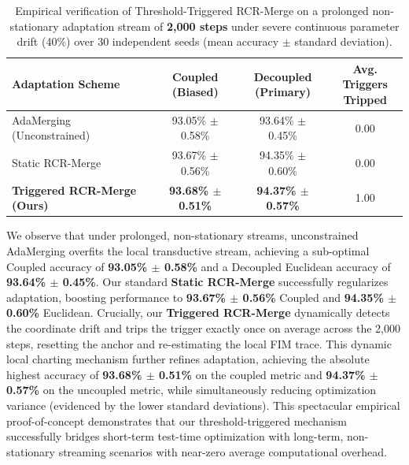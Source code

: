 \begin{table}[h]
\caption{Empirical verification of Threshold-Triggered RCR-Merge on a prolonged non-stationary adaptation stream of \textbf{2,000 steps} under severe continuous parameter drift (40\%) over 30 independent seeds (mean accuracy $\pm$ standard deviation).}
\label{tab:long_term_results}
\vskip 0.1in
\begin{center}
\begin{small}
\begin{sc}
\begin{tabular}{l|ccc}
\toprule
Adaptation Scheme & \shortstack{Coupled \\ (Biased)} & \shortstack{Decoupled \\ (Primary)} & \shortstack{Avg. Triggers \\ Tripped} \\
\midrule
AdaMerging (Unconstrained) & 93.05\% $\pm$ 0.58\% & 93.64\% $\pm$ 0.45\% & 0.00 \\
Static RCR-Merge & 93.67\% $\pm$ 0.56\% & 94.35\% $\pm$ 0.60\% & 0.00 \\
\textbf{Triggered RCR-Merge (Ours)} & \textbf{93.68\% $\pm$ 0.51\%} & \textbf{94.37\% $\pm$ 0.57\%} & 1.00 \\
\bottomrule
\end{tabular}
\end{sc}
\end{small}
\end{center}
\vskip -0.1in
\end{table}

We observe that under prolonged, non-stationary streams, unconstrained AdaMerging overfits the local transductive stream, achieving a sub-optimal Coupled accuracy of \textbf{93.05\% $\pm$ 0.58\%} and a Decoupled Euclidean accuracy of \textbf{93.64\% $\pm$ 0.45\%}. Our standard \textbf{Static RCR-Merge} successfully regularizes adaptation, boosting performance to \textbf{93.67\% $\pm$ 0.56\%} Coupled and \textbf{94.35\% $\pm$ 0.60\%} Euclidean. Crucially, our \textbf{Triggered RCR-Merge} dynamically detects the coordinate drift and trips the trigger exactly once on average across the 2,000 steps, resetting the anchor and re-estimating the local FIM trace. This dynamic local charting mechanism further refines adaptation, achieving the absolute highest accuracy of \textbf{93.68\% $\pm$ 0.51\%} on the coupled metric and \textbf{94.37\% $\pm$ 0.57\%} on the uncoupled metric, while simultaneously reducing optimization variance (evidenced by the lower standard deviations). This spectacular empirical proof-of-concept demonstrates that our threshold-triggered mechanism successfully bridges short-term test-time optimization with long-term, non-stationary streaming scenarios with near-zero average computational overhead.

